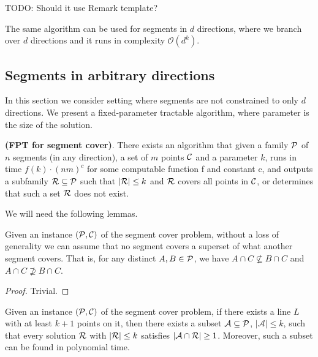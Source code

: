 TODO: Should it use Remark template?

The same algorithm can be used for segments in $d$ directions,
where we branch over $d$ directions and it runs in complexity $\mathcal{O}(d^k)$.

\subsection{Segments in arbitrary directions}
In this section we consider setting where segments are not constrained
to only $d$ directions. 
We present a fixed-parameter tractable algorithm,
where parameter is the size of the solution.

\label{segments_in_arbitrary_direction}
\begin{tw}{
	\label{segment_cover_fpt}
	\textbf{(FPT for segment cover)}.
	There exists an algorithm that given a family $\mathcal{P}$ of
	$n$ segments (in any direction),
	a set of $m$ points $\mathcal{C}$
	and a parameter $k$,
	runs in time $f(k) \cdot (nm)^c$ for some computable function f and constant c,
	and outputs a subfamily $\mathcal{R} \subseteq \mathcal{P}$
	such that $|\mathcal{R}| \le k$ and $\mathcal{R}$ covers all points in $\mathcal{C}$,
	or determines that such a set $\mathcal{R}$ does not exist.
}\end{tw}

We will need the following lemmas.

\begin{lemma}
   \label{fpt_reduction}
   Given an instance $(\mathcal{P}, \mathcal{C})$ of the segment cover problem,
   without a loss of generality we can assume that
   no segment covers a superset of what another segment covers.
   That is, for any distinct $A, B \in \mathcal{P}$, we have
   $A \cap C \not \subseteq B \cap C$ and $A \cap C \not \supseteq B \cap C$.
\end{lemma}   
   
\begin{proof} Trivial. \end{proof}

\begin{lemma}
	\label{fpt_long_lines}
	Given an instance $(\mathcal{P}, \mathcal{C})$ of the segment cover problem,
	if there exists a line $L$ with at least
	$k+1$ points on it, then there exists a subset $\mathcal{A} \subseteq \mathcal{P}$,
	$|\mathcal{A}| \le k$,
	such that every solution $\mathcal{R}$ with $|\mathcal{R}| \le k$
	satisfies $|\mathcal{A} \cap \mathcal{R}| \ge 1$.
	Moreover, such a subset can be found in polynomial time.
\end{lemma}

